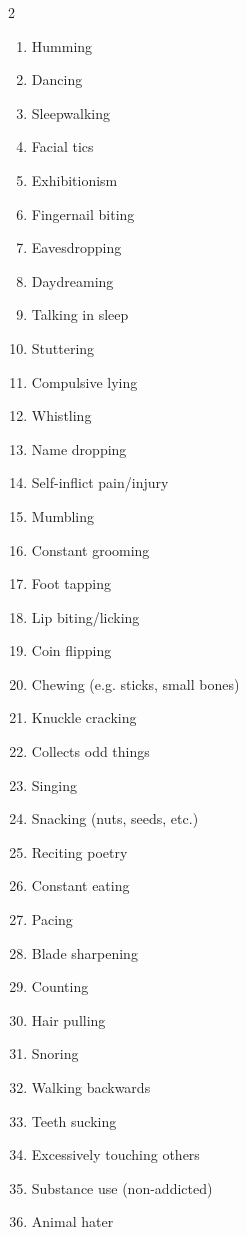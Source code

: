 \begin{multicols}{2} %
    \begin{enumerate}
        \item Humming
        \item Dancing
        \item Sleepwalking
        \item Facial tics
        \item Exhibitionism
        \item Fingernail biting
        \item Eavesdropping
        \item Daydreaming
        \item Talking in sleep
        \item Stuttering
        \item Compulsive lying
        \item Whistling
        \item Name dropping
        \item Self-inflict pain/injury
        \item Mumbling
        \item Constant grooming
        \item Foot tapping
        \item Lip biting/licking
        \item Coin flipping
        \item Chewing (e.g. sticks, small bones)
        \item Knuckle cracking
        \item Collects odd things
        \item Singing
        \item Snacking (nuts, seeds, etc.)
        \item Reciting poetry
        \item Constant eating
        \item Pacing
        \item Blade sharpening
        \item Counting
        \item Hair pulling
        \item Snoring
        \item Walking backwards
        \item Teeth sucking
        \item Excessively touching others
        \item Substance use (non-addicted)
        \item Animal hater

\end{enumerate}
\end{multicols}
